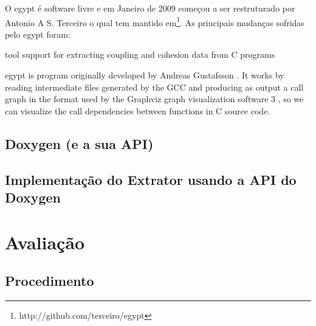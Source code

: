 O egypt é software livre e em Janeiro de 2009 começou a ser restruturado por Antonio A S. Terceiro o qual tem mantido em\footnote{http://github.com/terceiro/egypt}. As principais mudanças sofridas pelo egypt foram\cite{StructuralComplexityEvolution}:


tool support for extracting coupling and cohesion data from C programs

egypt is program originally developed by Andreas Gustafsson . It works by
reading intermediate files generated by the GCC and producing
as output a call graph in the format used by the Graphviz graph visualization
software 3 , so we can visualize the call dependencies between functions in C
source code.


\section{Doxygen (e a sua API)}


\section{Implementação do Extrator usando a API do Doxygen}

\chapter{Avaliação}
\section{Procedimento}
